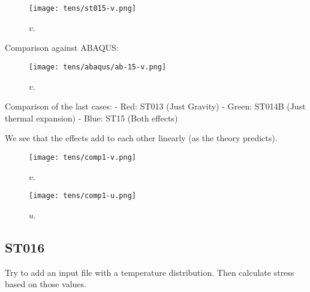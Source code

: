 \documentclass[11pt,letterpaper]{article}
\begin{document}
\begin{figure}[H]
	\centering
	\texttt{[image: tens/st015-v.png]}
	\hfill
	\caption{$v$.}
	\label{fig:st15}
\end{figure}

Comparison against ABAQUS:

\begin{figure}[H]
	\centering
	\texttt{[image: tens/abaqus/ab-15-v.png]}
	\hfill
	\caption{$v$.}
	\label{fig:st15ab}
\end{figure}

Comparison of the last cases:
- Red: ST013 (Just Gravity)
- Green: ST014B (Just thermal expansion)
- Blue: ST15 (Both effects)

We see that the effects add to each other linearly (as the theory predicts).

\begin{figure}[H]
	\centering
	\texttt{[image: tens/comp1-v.png]}
	\hfill
	\caption{$v$.}
	\label{fig:comp1v}
\end{figure}

\begin{figure}[H]
	\centering
	\texttt{[image: tens/comp1-u.png]}
	\hfill
	\caption{$u$.}
	\label{fig:comp1u}
\end{figure}

\subsection{ST016}

Try to add an input file with a temperature distribution. Then calculate stress based on those values.


\pagebreak 


\end{document}
